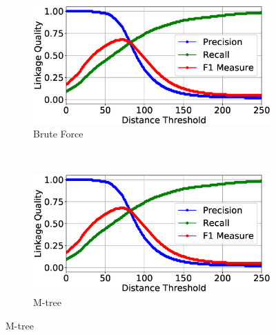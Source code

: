 \documentclass{llncs}
\begin{document}
\begin{figure}
\centering
\begin{subfigure}{.47\textwidth}
  \centering
\includegraphics[width=\textwidth]{figures/plotLQ-cora-brute}
\vspace{-6mm}
\caption{Brute Force}
\end{subfigure}%
~~
\begin{subfigure}{.47\textwidth}
  \centering
\includegraphics[width=\textwidth]{figures/plotLQ-cora-mtree}
\vspace{-6mm}
\caption{M-tree}
\end{subfigure} \vspace{4mm}


\end{figure}
\end{document}
